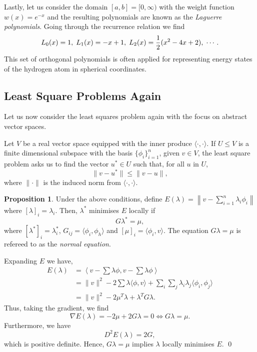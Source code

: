 \documentclass[
]{article}
\theoremstyle{definition}
\newtheorem{prop}{Proposition}
\theoremstyle{definition}
\begin{document}
Lastly, let us consider the domain \([a, b] = [0, \infty)\) with the
weight function \(w(x) = e^{-x}\) and the resulting polynomials are
known as the \emph{Laguerre polynomials}. Going through the recurrence
relation we find
\[L_0(x) = 1, \hspace{1mm} L_1(x) = -x + 1, \hspace{1mm} 
  L_2(x) = \frac{1}{2}(x^2 - 4 x +2), \hspace{1mm} \cdots.\] This set of
orthogonal polynomials is often applied for representing energy states
of the hydrogen atom in spherical coordinates.

\hypertarget{least-square-problems-again}{%
\subsection{Least Square Problems
Again}\label{least-square-problems-again}}

Let us now consider the least squares problem again with the focus on
abstract vector spaces.

Let \(V\) be a real vector space equipped with the inner produce
\(\langle \cdot, \cdot \rangle\). If \(U \le V\) is a finite dimensional
subspace with the basis \(\{\phi_i\}_{i = 1}^n\), given \(v \in V\), the
least square problem asks us to find the vector \(u^* \in U\) such that,
for all \(u\) in \(U\), \[\|v - u^*\| \le \|v - u\|,\] where
\(\| \cdot \|\) is the induced norm from
\(\langle \cdot, \cdot \rangle\).

\begin{prop}
  Under the above conditions, define \(E(\lambda) = 
  \left\| v - \sum_{i = 1}^n \lambda_i \phi_i \right\|\) where \([\lambda]_i = \lambda_i\). 
  Then, \(\lambda^*\) minimises \(E\) locally if
  \[G \lambda^* = \mu,\]
  where \([\lambda^*]_i = \lambda^*_i\), \(G_{ij} = \langle \phi_i, \phi_h \rangle\) and 
  \([\mu]_i = \langle \phi_i, v \rangle\). The equation \(G \lambda = \mu\) is 
  refereed to as the \textit{normal equation}.
\end{prop}
\proof

Expanding \(E\) we have, \[\begin{split}
    E(\lambda) & = \left\langle v - \sum \lambda \phi, v - \sum \lambda \phi \right\rangle \\ 
      & = \|v\|^2 - 2 \sum \lambda \langle \phi, v \rangle + 
        \sum_i \sum_j \lambda_i \lambda_j \langle \phi_i, \phi_j \rangle\\
      & = \|v\|^2 - 2 \mu^T \lambda + \lambda^T G \lambda.
  \end{split}\] Thus, taking the gradient, we find
\[\nabla E(\lambda) = -2 \mu + 2 G \lambda = 0 \iff G \lambda = \mu.\]
Furthermore, we have \[D^2 E(\lambda) = 2 G,\] which is positive
definite. Hence, \(G \lambda = \mu\) implies \(\lambda\) locally
minimises \(E\). \qed
\end{document}
